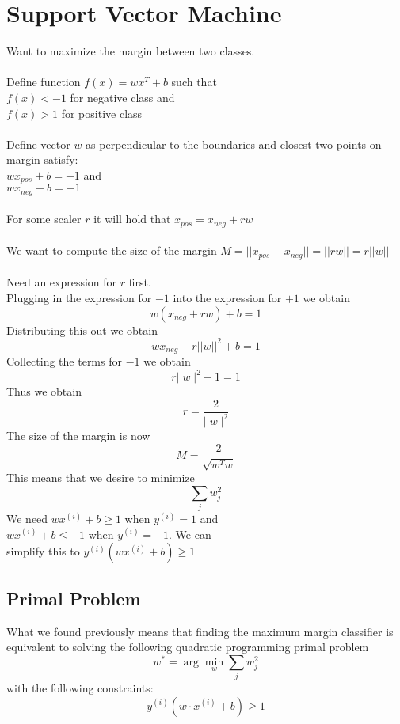 \documentclass[twoside,11pt]{article}
\theoremstyle{definition}
\begin{document}
\newpage

\section{Support Vector Machine}

Want to maximize the margin between two classes. \\
\\
Define function $f(x) = wx^T + b$ such that \\
$f(x)<-1$ for negative class and \\
$f(x)>1$ for positive class\\
\\
Define vector $w$ as perpendicular to the boundaries and closest two points on margin satisfy: \\
$w x_{pos} + b= +1$ and \\
$w x_{neg} + b = -1$\\
\\
For some scaler $r$ it will hold that $x_{pos} = x_{neg} + rw$\\
\\
We want to compute the size of the margin $M=||x_{pos}-x_{neg}|| = ||rw|| = r||w||$\\
\\
Need an expression for $r$ first.\\
Plugging in the expression for $-1$ into the expression for $+1$ we obtain
\[
w(x_{neg} + rw) + b = 1
\] 
Distributing this out we obtain
\[
w x_{neg} + r ||w||^2 + b = 1
\]
Collecting the terms for $-1$ we obtain
\[
r ||w||^2 - 1 = 1
\]
Thus we obtain
\[
r = \frac{2}{||w||^2}
\]
The size of the margin is now
\[
M = \frac{2}{\sqrt{w^Tw}}
\]
This means that we desire to minimize
\[
\sum_{j} w_j^2
\]
We need $w x^{(i)} + b \geq 1$ when $y^{(i)}=1$ and \\
$w x^{(i)} + b \leq -1$ when $y^{(i)}=-1$. We can\\
simplify this to $y^{(i)} (w x^{(i)} + b) \geq 1$

\newpage

\subsection{Primal Problem}

What we found previously means that finding the maximum margin classifier is equivalent to solving the following quadratic programming primal problem
\[
w^{*} = \arg \min_{w} \sum_j w_j^2
\]
with the following constraints:
\[
y^{(i)} ( w \cdot x^{(i)} + b) \geq 1
\]
\end{document}
